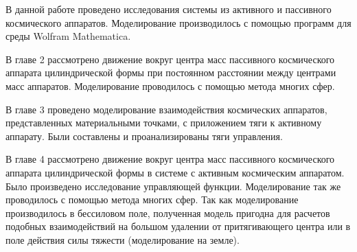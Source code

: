 В данной работе проведено исследования системы из активного и пассивного космического аппаратов. Моделирование производилось с помощью программ для среды Wolfram Mathematica.

В главе 2 рассмотрено движение вокруг центра масс пассивного космического аппарата цилиндрической формы при постоянном расстоянии между центрами масс аппаратов. Моделирование проводилось с помощью метода многих сфер.

В главе 3 проведено моделирование взаимодействия космических аппаратов, представленных материальными точками, с приложением тяги к активному аппарату. Были составлены и проанализированы тяги управления.

В главе 4 рассмотрено движение вокруг центра масс пассивного космического аппарата цилиндрической формы в системе с активным космическим аппаратом. Было произведено исследование управляющей функции. Моделирование так же проводилось с помощью метода многих сфер. Так как моделирование производилось в бессиловом поле, полученная модель пригодна для расчетов подобных взаимодействий на большом удалении от притягивающего центра или в поле действия силы тяжести (моделирование на земле).